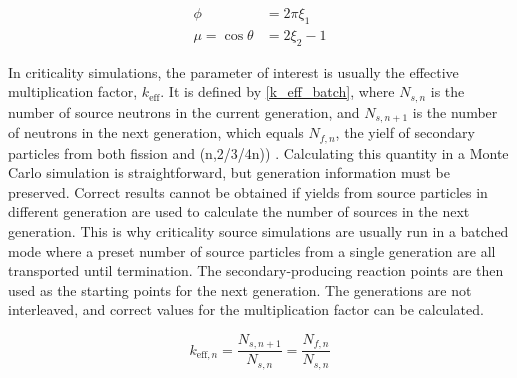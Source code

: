 \begin{equation}
\label{iso_samp}
\begin{split}
\phi &= 2 \pi \xi_1 \\
\mu= \cos \theta &= 2 \xi_2 -1
\end{split}
\end{equation}

In criticality simulations, the parameter of interest is usually the effective multiplication factor, $k_\mathrm{eff}$.  It is defined by \eqref{k_eff_batch}, where $N_{s,n}$ is the number of source neutrons in the current generation, and $N_{s,n+1}$ is the number of neutrons in the next generation, which equals $N_{f,n}$, the yielf of secondary particles from both fission and (n,2/3/4n)) \cite{jaakko}.  Calculating this quantity in a Monte Carlo simulation is straightforward, but generation information must be preserved.  Correct results cannot be obtained if yields from source particles in different generation are used to calculate the number of sources in the next generation.  This is why criticality source simulations are usually run in a batched mode where a preset number of source particles from a single generation are all transported until termination.  The secondary-producing reaction points are then used as the starting points for the next generation.  The generations are not interleaved, and correct values for the multiplication factor can be calculated.

\begin{equation}
\label{k_eff_batch}
k_{\mathrm{eff},n} = \frac{N_{s,n+1}}{N_{s,n}} = \frac{N_{f,n}}{N_{s,n}}
\end{equation}

